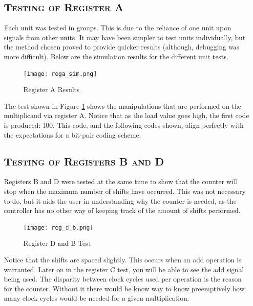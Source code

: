 \documentclass[11pt]{report}
\begin{document}
\begin{spacing}{1.5}
\subsection{\scshape Testing of Register A}
\label{sub:test_piso}

Each unit was tested in groups.  This is due to the reliance of one unit upon signals from other units.  It may have been simpler to test units individually, but the method chosen proved to provide quicker results (although, debugging was more difficult).  Below are the simulation results for the different unit tests.

\vspace{15px}
\begin{figure}[H]
    \centering
    \texttt{[image: rega\_sim.png]}
    \caption{Register A Results}
    \label{fig:rega}
\end{figure}

The test shown in Figure \ref{fig:rega} shows the manipulations that are performed on the multiplicand via register A.  Notice that as the load value goes high, the first code is produced: 100.  This code, and the following codes shown, align perfectly with the expectations for a bit-pair coding scheme.

\subsection{\scshape Testing of Registers B and D}
\label{sub:test_counter}

Registers B and D were tested at the same time to show that the counter will stop when the maximum number of shifts have occurred.  This was not necessary to do, but it aids the user in understanding why the counter is needed, as the controller has no other way of keeping track of the amount of shifts performed.

\vspace{15px}
\begin{figure}[H]
    \centering
    \texttt{[image: reg\_d\_b.png]}
    \caption{Register D and B Test}
    \label{fig:regd_b}
\end{figure}

Notice that the shifts are spaced slightly.  This occurs when an add operation is warranted.  Later on in the register C test, you will be able to see the add signal being used.  The disparity between clock cycles used per operation is the reason for the counter.  Without it there would be know way to know preemptively how many clock cycles would be needed for a given multiplication.


\end{spacing}
\end{document}
